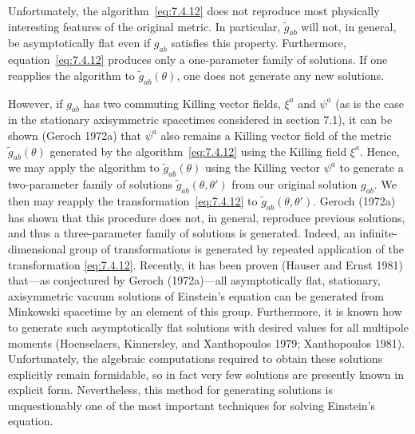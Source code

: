 Unfortunately, the algorithm~\eqref{eq:7.4.12} does not reproduce most physically
interesting features of the original metric. In particular, \(\widetilde g_{ab}\) will
not, in general, be asymptotically flat even if \(g_{ab}\) satisfies this property.
Furthermore, equation~\eqref{eq:7.4.12} produces only a one-parameter family of
solutions. If one reapplies the algorithm to \(\widetilde g_{ab}(\theta)\), one does
not generate any new solutions.

However, if \(g_{ab}\) has two commuting Killing vector fields, \(\xi^a\) and
\(\psi^a\) (as is the case in the stationary axisymmetric spacetimes considered in
section 7.1), it can be shown (Geroch 1972a) that \(\psi^a\) also remains a Killing
vector field of the metric \(\widetilde g_{ab}(\theta)\) generated by the
algorithm~\eqref{eq:7.4.12} using the Killing field \(\xi^a\). Hence, we may apply
the algorithm to \(\widetilde g_{ab}(\theta)\) using the Killing vector \(\psi^a\)
to generate a two-parameter family of solutions
\(\widetilde g_{ab}(\theta,\theta')\) from our original solution \(g_{ab}\). We
then may reapply the transformation~\eqref{eq:7.4.12} to
\(\widetilde g_{ab}(\theta,\theta')\). Geroch (1972a) has shown that this
procedure does not, in general, reproduce previous solutions, and thus a
three-parameter family of solutions is generated. Indeed, an infinite-dimensional
group of transformations is generated by repeated application of the transformation
\eqref{eq:7.4.12}. Recently, it has been proven (Hauser and Ernst 1981) that---as conjectured
by Geroch (1972a)---all asymptotically flat, stationary, axisymmetric vacuum
solutions of Einstein's equation can be generated from Minkowski spacetime by an
element of this group. Furthermore, it is known how to generate such asymptotically
flat solutions with desired values for all multipole moments (Hoenselaers, Kinnersley,
and Xanthopoulos 1979; Xanthopoulos 1981). Unfortunately, the algebraic
computations required to obtain these solutions explicitly remain formidable, so in
fact very few solutions are presently known in explicit form. Nevertheless, this
method for generating solutions is unquestionably one of the most important
techniques for solving Einstein's equation.
